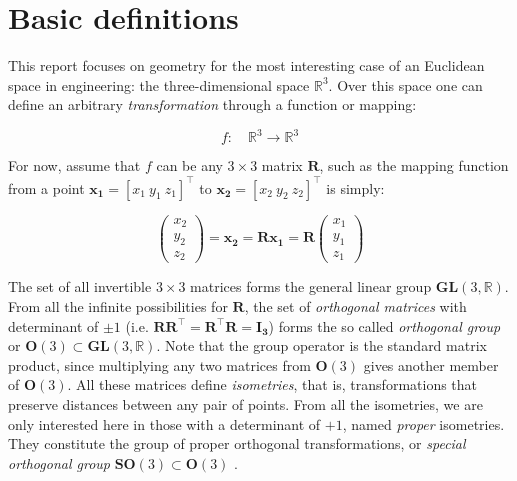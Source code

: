 \documentclass[a4paper,11pt]{report}
\begin{document}
\section{Basic definitions}
\label{sect:basic}

This report focuses on geometry for the most interesting case of an Euclidean space in
engineering: the three-dimensional space $\mathbb{R}^3$.
Over this space one can define an arbitrary \emph{transformation} through
a function or mapping:

\begin{equation}
 f: \quad \mathbb{R}^3 \rightarrow \mathbb{R}^3
\end{equation}

For now, assume that $f$ can be any $3 \times 3$ matrix $\mathbf{R}$,
such as the mapping function
from a point $\mathbf{x_1}=[x_1 ~ y_1 ~ z_1]^\top$ to $\mathbf{x_2}=[x_2 ~ y_2 ~ z_2]^\top$ is simply:

\begin{equation}
\left(
\begin{array}{c}
 x_2 \\ y_2 \\ z_2
\end{array}
\right)
=
 \mathbf{x_2}
=
\mathbf{R} \mathbf{x_1}
=
\mathbf{R}
\left(
\begin{array}{c}
 x_1 \\ y_1 \\ z_1
\end{array}
\right)
\end{equation}

The set of all invertible $3 \times 3$ matrices forms the
general linear group $\mathbf{GL}(3,\mathbb{R})$.
From all the infinite possibilities for $\mathbf{R}$, the set
of \emph{orthogonal matrices} with determinant of $\pm 1$
(i.e. $\mathbf{R}\mathbf{R}^\top=\mathbf{R}^\top\mathbf{R} = \mathbf{I_3}$)
forms the so called \emph{orthogonal group} or $\mathbf{O}(3) \subset \mathbf{GL}(3,\mathbb{R})$.
Note that the group operator is the standard matrix product, since multiplying
any two matrices from $\mathbf{O}(3)$ gives another member of $\mathbf{O}(3)$.
All these matrices define \emph{isometries}, that is, transformations that
preserve distances between any pair of points.
From all the isometries, we are only interested here in those with a
determinant of $+1$, named \emph{proper} isometries.
They constitute the group of proper orthogonal transformations, or
\emph{special orthogonal group} $\mathbf{SO}(3) \subset \mathbf{O}(3)$
\cite{gallier2001geometric}.
\end{document}
